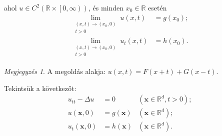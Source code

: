 \documentclass[DIV=15,appendixprefix]{scrreprt}
\theoremstyle{definition}
\theoremstyle{remark}
\newtheorem*{megj}{Megjegyzés}
\begin{document}
ahol $ u \in C^{ 2 } \left( \mathbb{ R } \times \left.\left[ 0,{} \infty \right)\right.\right) $, és
minden $ x_{ 0 } \in \mathbb{ R } $ esetén
\begin{equation*}
	\begin{aligned}
		\lim_{ \substack{ \left( x,{} t \right) \rightarrow \left( x_{ 0 },{} 0 \right)\\t > 0 } }
		u \left( x,{} t \right) 		&= g \left( x_{ 0 } \right);\\
		\lim_{ \substack{ \left( x,{} t \right) \rightarrow \left( x_{ 0 },{} 0 \right)\\t > 0 } }
		u_{ t } \left( x,{} t \right) 	&= h \left( x_{ 0 } \right).
	\end{aligned}
\end{equation*}
\begin{megj}
	A megoldás alakja: $ u \left( x,{} t \right) = F\left( x + t \right) + G \left( x - t \right) $.
\end{megj}
%
Tekintsük a következőt:
\begin{equation*}
	\begin{aligned}
		u_{ tt } - \Delta u 						&= 0 								&
			\left( \mathbf{ x } \in \mathbb{ R }^{ d },{} t > 0 \right);\\
		u \left( \mathbf{ x },{} 0 \right) 			&= g \left( \mathbf{ x } \right) 	&
			\left( \mathbf{ x } \in \mathbb{ R }^{ d } \right);\\
		u_{ t } \left( \mathbf{ x },{} 0 \right) 	&= h \left( \mathbf{ x } \right) 	&
			\left( \mathbf{ x } \in \mathbb{ R }^{ d } \right).
	\end{aligned}
\end{equation*}
\end{document}
